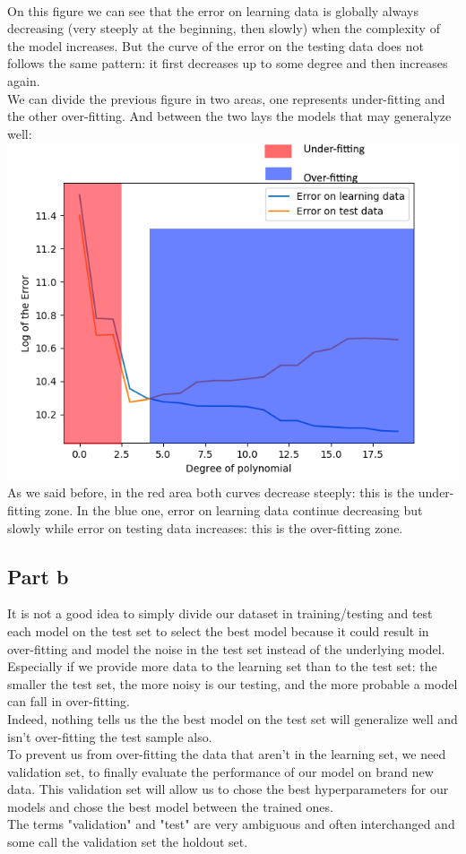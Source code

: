 \documentclass[a4paper, 10pt]{article}
\begin{document}
\\
On this figure we can see that the error on learning data is globally always decreasing (very steeply at the beginning, then slowly)
when the complexity of the model increases. But the curve of the error on the testing data does not follows the same pattern: it first 
decreases up to some degree and then increases again. 
\\
We can divide the previous figure in two areas, one represents under-fitting and the other over-fitting. And between the 
two lays the models that may generalyze well:
\\
\includegraphics{ex1a_area}
\\
As we said before, in the red area both curves decrease steeply: this is the under-fitting zone.
In the blue one, error on learning data continue decreasing but slowly while error on testing data increases:
this is the over-fitting zone.

\subsection{Part b}
It is not a good idea to simply divide our dataset in training/testing and
test each model on the test set to select the best model because it could result in over-fitting
and model the noise in the test set instead of the underlying model. Especially if we 
provide more data to the learning set than to the test set: the smaller the test set,
the more noisy is our testing, and the more probable a model can fall in over-fitting.
\\
Indeed, nothing tells us the the best model on the test set will generalize well and isn't 
over-fitting the test sample also.
\\
To prevent us from over-fitting the data that aren't in the learning set, we need
validation set, to finally evaluate the performance of our model on brand new data.
This validation set will allow us to chose the best hyperparameters for our models and chose the
best model between the trained ones.
\\
The terms "validation" and "test" are very ambiguous and often interchanged and some
call the validation set the holdout set.
\end{document}
